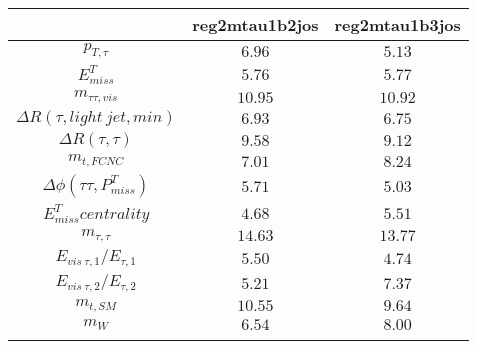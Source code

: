 \centering
\begin{tabular}{ccc} \toprule\toprule
 & reg2mtau1b2jos & reg2mtau1b3jos\\\midrule
$p_{T,\tau }$ & $6.96$ & $5.13$\\
$E^{T}_{miss}$ & $5.76$ & $5.77$\\
$m_{\tau \tau ,vis}$ & $10.95$ & $10.92$\\
$\Delta R(\tau ,light~jet,min)$ & $6.93$ & $6.75$\\
$\Delta R(\tau ,\tau )$ & $9.58$ & $9.12$\\
$m_{t,FCNC}$ & $7.01$ & $8.24$\\
$\Delta\phi(\tau \tau ,P^{T}_{miss})$ & $5.71$ & $5.03$\\
$E^{T}_{miss} centrality$ & $4.68$ & $5.51$\\
$m_{\tau ,\tau }$ & $14.63$ & $13.77$\\
$E_{vis~\tau ,1}/E_{\tau ,1}$ & $5.50$ & $4.74$\\
$E_{vis~\tau ,2}/E_{\tau ,2}$ & $5.21$ & $7.37$\\
$m_{t,SM}$ & $10.55$ & $9.64$\\
$m_{W}$ & $6.54$ & $8.00$\\
\bottomrule\bottomrule\\
\end{tabular}

